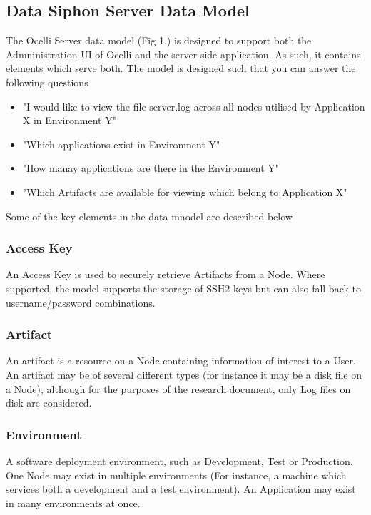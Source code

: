 \documentclass{llncs}
\begin{document}
\subsection{Data Siphon Server Data Model}

The Ocelli Server data model (Fig 1.) is designed to support both the Admninistration UI of Ocelli and the server side application. As such, it contains elements which serve both. The model is designed such that you can answer the following questions

\begin{itemize}
\item "I would like to view the file server.log across all nodes utilised by Application X in Environment Y"
\item "Which applications exist in Environment Y"
\item "How manay applications are there in the Environment Y"
\item "Which Artifacts are available for viewing which belong to Application X"
\end{itemize}

Some of the key elements in the data mnodel are described below

\subsubsection{Access Key}

An Access Key is used to securely retrieve Artifacts from a Node. Where supported, the model supports the storage of SSH2 keys but can also fall back to username/password combinations.

\subsubsection{Artifact}

An artifact is a resource on a Node containing information of interest to a User. An artifact may be of several different types (for instance it may be a disk file on a Node), although for the purposes of the research document, only Log files on disk are considered.

\subsubsection{Environment}

A software deployment environment, such as Development, Test or Production. One Node may exist in multiple environments (For instance, a machine which services both a development and a test environment). An Application may exist in many environments at once.
\end{document}
